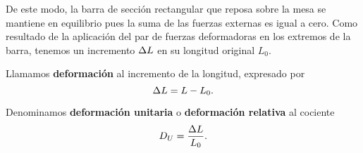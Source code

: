 De este modo, la barra de sección rectangular que reposa sobre la mesa se mantiene en equilibrio pues la suma de las fuerzas externas es igual a cero. Como resultado de la aplicación del par de fuerzas deformadoras en los extremos de la barra, tenemos un incremento $\Delta L$ en su longitud original $L_0$.
\begin{definition}{}{}
    Llamamos \textbf{deformación} al incremento de la longitud, expresado por
    $$\Delta L = L - L_0.$$
\end{definition}
\begin{definition}{}{}
    Denominamos \textbf{deformación unitaria} o \textbf{deformación relativa} al cociente
    $$D_U = \frac{\Delta L}{L_0}.$$
\end{definition}









